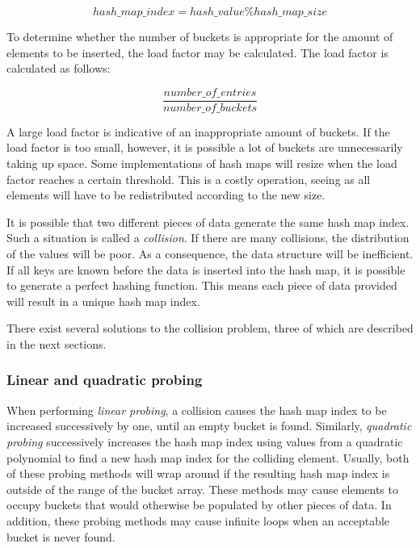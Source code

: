 \documentclass{article}
\begin{document}
\begin{equation}
  hash\_map\_index = hash\_value \% hash\_map\_size
\end{equation}

To determine whether the number of buckets is appropriate for the amount of elements to be inserted,
the load factor may be calculated. The load factor is calculated as follows:

\begin{equation}
  \frac{number\_of\_entries}{number\_of\_buckets}
\end{equation}

A large load factor is indicative of an inappropriate amount of buckets.
If the load factor is too small, however, it is possible a lot of buckets are unnecessarily taking up space.
Some implementations of hash maps will resize when the load factor reaches a certain threshold.
This is a costly operation, seeing as all elements will have to be redistributed according to the new size.

It is possible that two different pieces of data generate the same hash map index.
Such a situation is called a {\em collision}. If there are many collisions, the distribution of the values
will be poor. As a consequence, the data structure will be inefficient.
If all keys are known before the data is inserted into the hash map, it is possible to generate a perfect
hashing function. This means each piece of data provided will result in a unique hash map index.

There exist several solutions to the collision problem, three of which are described in the next sections.

\subsubsection{Linear and quadratic probing}
When performing {\em linear probing}, a collision causes the hash map index to be increased successively by one,
until an empty bucket is found. Similarly, {\em quadratic probing} successively increases the hash map index using
values from a quadratic polynomial to find a new hash map index for the colliding element.
Usually, both of these probing methods will wrap around if the resulting hash map index is outside of the range
of the bucket array. These methods may cause elements to occupy buckets that would otherwise be populated by
other pieces of data. In addition, these probing methods may cause infinite loops when an acceptable bucket is
never found.
\end{document}
